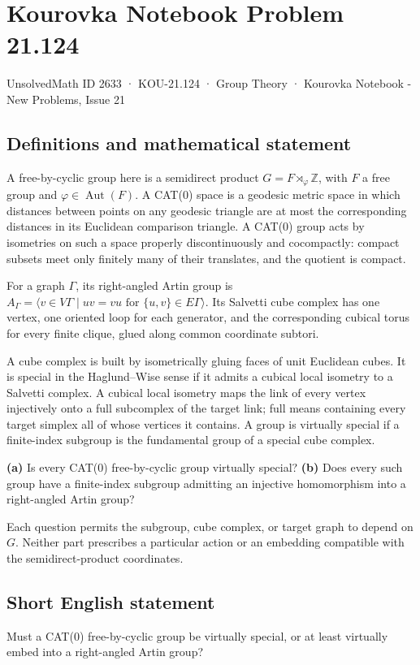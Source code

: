 \documentclass[11pt,a4paper]{article}
\begin{document}
\section*{Kourovka Notebook Problem 21.124}\label{2633}
{\small UnsolvedMath ID 2633 · KOU-21.124 · Group Theory · Kourovka Notebook - New Problems, Issue 21}
\subsection{Definitions and mathematical statement}
A free-by-cyclic group here is a semidirect product $G=F\rtimes_\varphi\mathbb Z$, with $F$ a free group and $\varphi\in\operatorname{Aut}(F)$. A CAT(0) space is a geodesic metric space in which distances between points on any geodesic triangle are at most the corresponding distances in its Euclidean comparison triangle. A CAT(0) group acts by isometries on such a space properly discontinuously and cocompactly: compact subsets meet only finitely many of their translates, and the quotient is compact.

For a graph $\Gamma$, its right-angled Artin group is $A_\Gamma=\langle v\in V\Gamma\mid uv=vu\text{ for }\{u,v\}\in E\Gamma\rangle$. Its Salvetti cube complex has one vertex, one oriented loop for each generator, and the corresponding cubical torus for every finite clique, glued along common coordinate subtori.

A cube complex is built by isometrically gluing faces of unit Euclidean cubes. It is special in the Haglund--Wise sense if it admits a cubical local isometry to a Salvetti complex. A cubical local isometry maps the link of every vertex injectively onto a full subcomplex of the target link; full means containing every target simplex all of whose vertices it contains. A group is virtually special if a finite-index subgroup is the fundamental group of a special cube complex.

\textbf{(a)} Is every CAT(0) free-by-cyclic group virtually special?
\textbf{(b)} Does every such group have a finite-index subgroup admitting an injective homomorphism into a right-angled Artin group?

Each question permits the subgroup, cube complex, or target graph to depend on $G$. Neither part prescribes a particular action or an embedding compatible with the semidirect-product coordinates.
\subsection{Short English statement}
Must a CAT(0) free-by-cyclic group be virtually special, or at least virtually embed into a right-angled Artin group?
\end{document}
